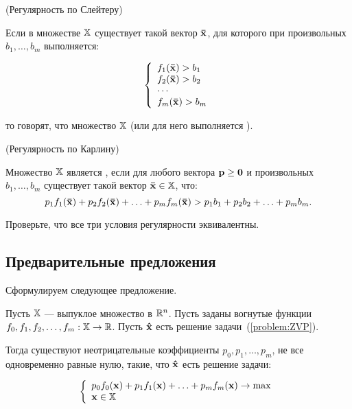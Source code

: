 \begin{dfn}(Регулярность по Слейтеру)

Если в множестве $\mathbb{X}$ существует такой вектор $\mathbf{\bar x}$, для
которого при произвольных $b_1, \ldots, b_m$ выполняется:

\[
\left\{ \begin{array}{l}
 f_1(\mathbf{\bar x}) > b_1\\
 f_2(\mathbf{\bar x}) > b_2 \\
  \cdots  \\
 f_m(\mathbf{\bar x}) > b_m \\
 \end{array} \right.
\]

\noindent то говорят, что множество $\mathbb{X}$  (или для него выполняется ).

\end{dfn}

\begin{dfn} (Регулярность по Карлину)

Множество $\mathbb{X}$ является , если для
любого вектора $\mathbf{p} \geq \mathbf{0}$ и произвольных $b_1, \ldots,
b_m$ существует такой вектор $\mathbf{\bar x} \in \mathbb{X}$, что:
\[
p_1 f_1(\mathbf{\bar x}) + p_2 f_2(\mathbf{\bar x}) + \ldots + p_m
f_m(\mathbf{\bar x}) > p_1 b_1 + p_2 b_2 + \ldots + p_m b_m.
\]

\end{dfn}

\begin{exer}
Проверьте, что все три условия регулярности эквивалентны.
\end{exer}


\subsection{Предварительные предложения}

Сформулируем следующее предложение.

\begin{prop}\label{prop:necessity_TKT}

Пусть $\mathbb{X}$ --- выпуклое множество в $\mathbb{R}^n$. Пусть заданы
вогнутые функции $f_0, f_1, f_2, \ldots, f_m: \mathbb{X} \to \mathbb{R}$. Пусть
$\mathbf{\hat x}$ есть решение задачи~(\ref{problem:ZVP}).

Тогда существуют неотрицательные коэффициенты $p_0, p_1, \ldots,
p_m$, не все одновременно равные нулю, такие, что $\mathbf{\hat x}$ есть
решение задачи:

\[
\left\{ \begin{array}{l}
 p_0 f_0(\mathbf{x}) + p_1 f_1(\mathbf{x})+ \ldots + p_m f_m(\mathbf{x}) \to \max  \\
 \mathbf{x} \in \mathbb{X} \\
 \end{array} \right.
\]

\end{prop}

